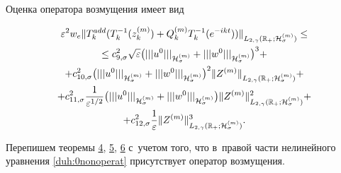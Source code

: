Оценка оператора возмущения имеет вид

\begin{multline*}

\varepsilon^2w_e 

\| T^{add}_k(T^{-1}_{k}(z_{k}^{(m)})+Q_{k}^{(m)}T^{-1}_{k}(e^{-ikt}))  \|_{L_{2,\gamma}(\mathbb R_{+};{\cal H}^{(m)}_{\sigma})}\le 

\\

\le c_{9,\sigma}^2 \sqrt{\varepsilon} \bigl(|||u^0|||_{{\cal H}^{(m)}_\sigma}+|||w^0|||_{{\cal H}^{(m)}_\sigma}\bigr)^3 + 

\\

+c_{10,\sigma}^2 \bigl(|||u^0|||_{{\cal H}^{(m)}_\sigma}+|||w^0|||_{{\cal H}^{(m)}_\sigma}\bigr)^2 

\|Z^{(m)}\|_{L_{2,\gamma}(\mathbb R_{+};{\cal H}^{(m)}_{\sigma})}+

\\

+c_{11,\sigma}^2 \frac{1}{\varepsilon^{1/2}} 

\bigl(|||u^0|||_{{\cal H}^{(m)}_\sigma}+|||w^0|||_{{\cal H}^{(m)}_\sigma}\bigr)

\|Z^{(m)}\|^2_{L_{2,\gamma}(\mathbb R_{+};{\cal H}^{(m)}_{\sigma})}+ \\+

c_{12,\sigma}^2 \frac{1}{\varepsilon}\|Z^{(m)}\|^3_{L_{2,\gamma}(\mathbb R_{+};{\cal H}^{(m)}_{\sigma})}.

\end{multline*}

Перепишем теоремы \hyperlink{dukh:th:4}{4}, \hyperlink{dukh:th:5}{5}, \hyperlink{dukh:th:6}{6} с~учетом того, что в~правой части нелинейного уравнения \eqref{duh:0nonoperat} присутствует оператор возмущения.



\smallskip



